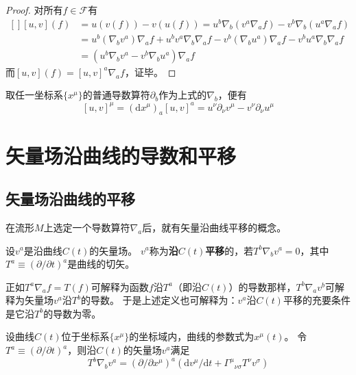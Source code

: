 \begin{proof}
对所有$f \in \mathscr{F}$有
$$\begin{aligned}[]
[u, v](f) & = u(v(f)) - v(u(f)) = u^b\nabla_b(v^a\nabla_af) - v^b\nabla_b(u^a\nabla_af) \\
& = u^b(\nabla_bv^a)\nabla_af + u^bv^a\nabla_b\nabla_af - v^b(\nabla_bu^a)\nabla_af - v^bu^a\nabla_b\nabla_af \\
& = (u^b\nabla_bv^a - v^b\nabla_bu^a)\nabla_af
\end{aligned}$$
而$[u, v](f) = [u, v]^a\nabla_af$，证毕。
\end{proof}

\begin{note}
取任一坐标系$\{x^\mu\}$的普通导数算符$\partial_b$作为上式的$\nabla_b$，便有
$$[u, v]^\mu = (\mathrm{d}x^\mu)_a[u, v]^a = u^\nu\partial_\nu v^\mu - v^\nu\partial_\nu u^\mu$$
\end{note}

\section{矢量场沿曲线的导数和平移}

\subsection{矢量场沿曲线的平移}
在流形$M$上选定一个导数算符$\nabla_a$后，就有矢量沿曲线平移的概念。

\begin{definition}
设$v^a$是沿曲线$C(t)$的矢量场。
$v^a$称为\textbf{沿$C(t)$平移}的，若$T^b\nabla_bv^a = 0$，其中$T^a \equiv (\partial / \partial t)^a$是曲线的切矢。
\end{definition}

正如$T^a\nabla_af = T(f)$可解释为函数$f$沿$T^a$（即沿$C(t)$）的导数那样，$T^b\nabla_av^b$可解释为矢量场$v^a$沿$T^b$的导数。
于是上述定义也可解释为：$v^a$沿$C(t)$平移的充要条件是它沿$T^b$的导数为零。

\begin{theorem}
设曲线$C(t)$位于坐标系$\{x^\mu\}$的坐标域内，曲线的参数式为$x^\mu(t)$。
令$T^a \equiv (\partial / \partial t)^a$，则沿$C(t)$的矢量场$v^a$满足
$$T^b\nabla_bv^a = (\partial / \partial x^\mu)^a(\mathrm{d}v^\mu / \mathrm{d}t + \Gamma^\mu{}_{\nu\sigma}T^\nu v^\sigma)$$
\end{theorem}

